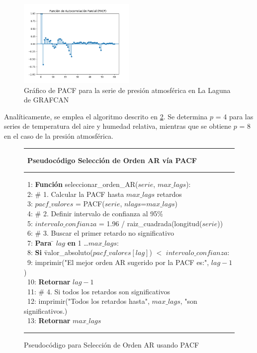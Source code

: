 \begin{figure}[H]
    \centering
    \includegraphics[width=0.5\textwidth]{images/arima_pacf_pres.png}
    \caption{Gráfico de PACF para la serie de presión atmosférica en La Laguna de GRAFCAN}
    \label{arima_pacf_pres}
\end{figure}


Analíticamente, se emplea el algoritmo descrito en \ref{pacf_ar_order}. Se determina $p$ = 4 para las series de temperatura del aire y humedad relativa, mientras 
que se obtiene $p$ = 8 en el caso de la presión atmosférica.

\begin{figure}[H]
    {\small
    \hrule \
    {\bf\small Pseudocódigo Selección de Orden AR vía PACF}
    \hrule
    \begin{center}
    \begin{tabbing}
    \ 1: {\bf Fun}\={\bf ción} seleccionar\_orden\_AR($serie$, $max\_lags$): \\
    \ 2: \> \# 1. Calcular la PACF hasta $max\_lags$ retardos \\
    \ 3: \> $pacf\_valores$ = PACF($serie$, $nlags$=$max\_lags$) \\
    \ 4: \> \# 2. Definir intervalo de confianza al 95\% \\
    \ 5: \> $intervalo\_confianza$ = 1.96 / raiz\_cuadrada(longitud($serie$)) \\
    \ 6: \> \# 3. Buscar el primer retardo no significativo \\
    \ 7: \> {\bf Para} \= $lag$ {\bf en} 1 \dots $max\_lags$: \\
    \ 8: \> \> {\bf Si} \= valor\_absoluto($pacf\_valores[lag]$) $<$ $intervalo\_confianza$: \\
    \ 9: \> \> \> imprimir("El mejor orden AR sugerido por la PACF es:", $lag-1$) \\
    \ 10: \> \> \> {\bf Retornar} $lag-1$ \\
    \ 11: \> \# 4. Si todos los retardos son significativos \\
    \ 12: \> imprimir("Todos los retardos hasta", $max\_lags$, "son significativos.) \\
    \ 13: \> {\bf Retornar} $max\_lags$ \\
    \end{tabbing}
    \end{center}
    \hrule
    }
    \caption{Pseudocódigo para Selección de Orden AR usando PACF}
    \label{pacf_ar_order}
\end{figure}

